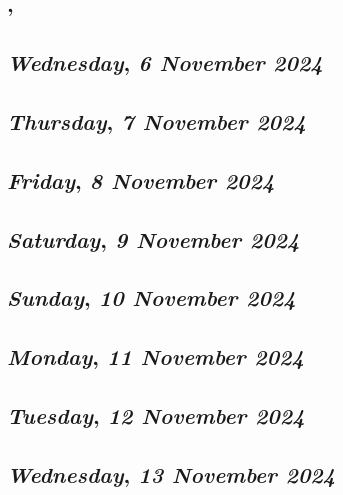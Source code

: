 \subsection*{\weekday, \day}

\def\day{\textit{6 November 2024}}
\def\weekday{\textit{Wednesday}}
\subsection*{\weekday, \day}

\def\day{\textit{7 November 2024}}
\def\weekday{\textit{Thursday}}
\subsection*{\weekday, \day}

\def\day{\textit{8 November 2024}}
\def\weekday{\textit{Friday}}
\subsection*{\weekday, \day}

\def\day{\textit{9 November 2024}}
\def\weekday{\textit{Saturday}}
\subsection*{\weekday, \day}

\def\day{\textit{10 November 2024}}
\def\weekday{\textit{Sunday}}
\subsection*{\weekday, \day}

\def\day{\textit{11 November 2024}}
\def\weekday{\textit{Monday}}
\subsection*{\weekday, \day}

\def\day{\textit{12 November 2024}}
\def\weekday{\textit{Tuesday}}
\subsection*{\weekday, \day}

\def\day{\textit{13 November 2024}}
\def\weekday{\textit{Wednesday}}
\subsection*{\weekday, \day}

